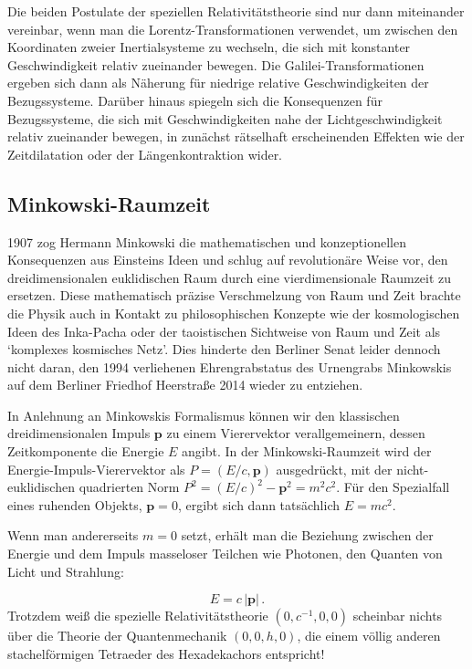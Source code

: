 \documentclass{scrartcl}
\begin{document}
Die beiden Postulate der speziellen Relativitätstheorie sind nur dann miteinander vereinbar, wenn man die Lorentz-Transformationen verwendet, um zwischen den Koordinaten zweier Inertialsysteme zu wechseln, die sich mit konstanter Geschwindigkeit relativ zueinander bewegen. Die Galilei-Transformationen ergeben sich dann als Näherung für niedrige relative Geschwindigkeiten der Bezugssysteme. Darüber hinaus spiegeln sich die Konsequenzen für Bezugssysteme, die sich mit Geschwindigkeiten nahe der  Lichtgeschwindigkeit relativ zueinander bewegen, in zunächst rätselhaft erscheinenden Effekten wie der Zeitdilatation oder der Längenkontraktion wider.


\subsection*{Minkowski-Raumzeit}

1907 zog Hermann Minkowski die mathematischen und konzeptionellen Konsequenzen aus Einsteins Ideen und schlug auf revolutionäre Weise vor, den dreidimensionalen euklidischen Raum durch eine vierdimensionale Raumzeit zu ersetzen. Diese mathematisch präzise Verschmelzung von Raum und Zeit brachte die Physik auch in Kontakt zu philosophischen Konzepte wie der kosmologischen Ideen des Inka-Pacha oder der taoistischen Sichtweise von Raum und Zeit als \enquote*{komplexes kosmisches Netz}. Dies hinderte den Berliner Senat leider dennoch nicht daran, den 1994 verliehenen Ehrengrabstatus des Urnengrabs Minkowskis auf dem Berliner Friedhof Heerstraße 2014 wieder zu entziehen. 


In Anlehnung an Minkowskis Formalismus können wir den klassischen dreidimensionalen Impuls $\mathbf{p}$ zu einem Vierervektor verallgemeinern, dessen Zeitkomponente die Energie $E$ angibt. In der Minkowski-Raumzeit wird der Energie-Impuls-Vierervektor als $P = (E/c, \mathbf{p})$ ausgedrückt, mit der nicht-euklidischen quadrierten Norm $P^2=(E/c)^2 - \mathbf{p}^2 = m^2c^2$. Für den Spezialfall eines ruhenden Objekts, $\mathbf{p} = 0$, ergibt sich dann tatsächlich $E=m c^2$.

Wenn man andererseits $m=0$ setzt, erhält man die Beziehung zwischen der Energie und dem Impuls masseloser Teilchen wie Photonen, den Quanten von Licht und Strahlung:

\begin{equation*}\label{emc2}
  E=c\, |\mathbf{p}|\,.
\end{equation*}
%
Trotzdem weiß die spezielle Relativitätstheorie $(0,c^{-1},0,0)$ scheinbar nichts über die Theorie der Quantenmechanik $(0,0,h,0)$, die einem völlig anderen stachelförmigen Tetraeder des Hexadekachors entspricht!
\end{document}
